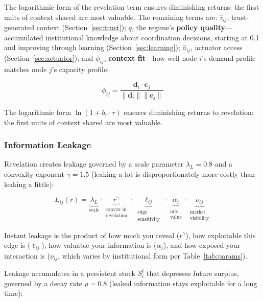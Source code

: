 \documentclass[12pt]{article}
\theoremstyle{definition}
\begin{document}
\noindent The logarithmic form of the revelation term ensures diminishing returns: the first units of context shared are most valuable. The remaining terms are: $\hat{\tau}_{ij}$, trust-generated context (Section~\ref{sec:trust}); $q$, the regime's \textbf{policy quality}---accumulated institutional knowledge about coordination decisions, starting at 0.1 and improving through learning (Section~\ref{sec:learning}); $\hat{a}_{ij}$, actuator access (Section~\ref{sec:actuator}); and $\phi_{ij}$, \textbf{context fit}---how well node $i$'s demand profile matches node $j$'s capacity profile:

\begin{equation}
\phi_{ij} = \frac{\mathbf{d}_i \cdot \mathbf{c}_j}{\|\mathbf{d}_i\| \|\mathbf{c}_j\|}
\end{equation}

The logarithmic form $\ln(1 + b_r \cdot r)$ ensures diminishing returns to revelation: the first units of context shared are most valuable.

\subsubsection{Information Leakage}
\label{sec:leakage}

Revelation creates leakage governed by a scale parameter $\lambda_L = 0.8$ and a convexity exponent $\gamma = 1.5$ (leaking a lot is disproportionately more costly than leaking a little):

\begin{equation}
\label{eq:leakage}
L_{ij}(r) = \underbrace{\lambda_L}_{\text{scale}} \cdot \underbrace{r^{\gamma}}_{\substack{\text{convex in} \\ \text{revelation}}} \cdot \underbrace{\ell_{ij}}_{\substack{\text{edge} \\ \text{sensitivity}}} \cdot \underbrace{\alpha_i}_{\substack{\text{info} \\ \text{value}}} \cdot \underbrace{\nu_{ij}}_{\substack{\text{market} \\ \text{visibility}}}
\end{equation}

\noindent Instant leakage is the product of how much you reveal ($r^\gamma$), how exploitable this edge is ($\ell_{ij}$), how valuable your information is ($\alpha_i$), and how exposed your interaction is ($\nu_{ij}$, which varies by institutional form per Table~\ref{tab:params}).

Leakage accumulates in a persistent stock $S_i^t$ that depresses future surplus, governed by a decay rate $\rho = 0.8$ (leaked information stays exploitable for a long time):
\end{document}
